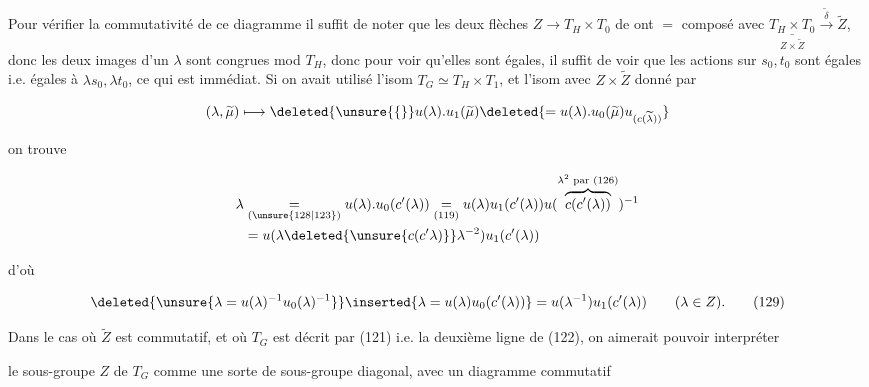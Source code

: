Pour vérifier la commutativité de ce diagramme il suffit de  noter que les  deux flèches  $Z\longrightarrow T_H\times T_0$ de  ont $=$ composé avec $\underset{Z\times\widetilde Z}{\underline{T_H\times T_0}}\xrightarrow{\widetilde\delta}\widetilde Z$, donc les deux images d'un $\lambda$ sont congrues mod $T_H$, donc pour voir qu'elles sont égales, il suffit de voir que les  actions sur $s_0,t_0$ sont égales i.e. égales à $\lambda s_0,\lambda t_0$, ce qui est immédiat. Si on avait utilisé l'isom $T_G\simeq T_H\times T_1$, et l'isom avec $Z\times\widetilde Z$ donné par

\[(\lambda,\widetilde\mu)\longmapsto\deleted{\unsure{\{} }u(\lambda).u_1(\widetilde\mu)\deleted{=u(\lambda).u_0(\widetilde\mu)u_{(c(\widetilde\lambda))}}\]

on trouve

\[\begin{aligned}
\lambda&\underset{(\unsure{128|123})}{=}u(\lambda).u_0(c'(\lambda))
\underset{(119)}{=}u(\lambda)u_1(c'(\lambda))u(\overbrace{c(c'(\lambda))}^{\lambda^2\text{ par }(126)})^{-1}\\
&=u(\lambda\deleted{\unsure{c(c'\lambda)}}\lambda^{-2})u_1(c'(\lambda))
\end{aligned}\]

d'où

\[\deleted{\unsure{\lambda=u(\lambda)^{-1}u_0(\lambda)^{-1}}}
\inserted{\lambda=u(\lambda)u_0(c'(\lambda))}
=u(\lambda^{-1})u_1(c'(\lambda))\qquad(\lambda\in Z).\tag*{(129)}\]

Dans le cas où $\widetilde Z$ est commutatif, et où $T_G$ est décrit par (121) i.e. la deuxième ligne de (122), on aimerait pouvoir interpréter


le sous-groupe $Z$ de $T_G$ comme une sorte de sous-groupe diagonal, avec un diagramme commutatif


